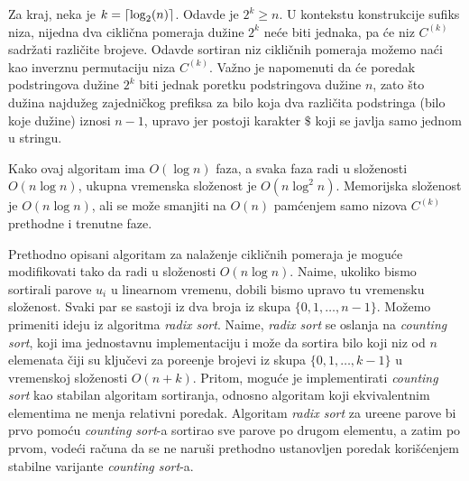 Za kraj, neka je $k = \left \lceil \log_2(n) \right \rceil$. Odavde je $2^k \geq n$. U kontekstu konstrukcije sufiks niza, nijedna dva cikli\v cna pomeraja du\v zine $2^k$ ne\' ce biti jednaka, pa \' ce niz $C^{(k)}$ sadr\v zati razli\v cite brojeve. Odavde sortiran niz cikli\v cnih pomeraja mo\v zemo na\' ci kao inverznu permutaciju niza $C^{(k)}$. Va\v zno je napomenuti da \' ce poredak podstringova du\v zine $2^k$ biti jednak poretku podstringova du\v zine $n$, zato \v sto du\v zina najdu\v zeg zajedni\v ckog prefiksa za bilo koja dva razli\v cita podstringa (bilo koje du\v zine) iznosi $n-1$, upravo jer postoji karakter $\$$ koji se javlja samo jednom u stringu.

Kako ovaj algoritam ima $O(\log n)$ faza, a svaka faza radi u slo\v zenosti $O(n \log n)$, ukupna vremenska slo\v zenost je $O(n \log^2 n)$. Memorijska slo\v zenost je $O(n \log n)$, ali se mo\v ze smanjiti na $O(n)$ pam\' cenjem samo nizova $C^{(k)}$ prethodne i trenutne faze.

\noindent
\begin{minipage}[l]{\textwidth}

\end{minipage}

Prethodno opisani algoritam za nala\v zenje cikli\v cnih pomeraja je mogu\' ce modifikovati tako da radi u slo\v zenosti $O(n \log n)$. Naime, ukoliko bismo sortirali parove $u_i$ u linearnom vremenu, dobili bismo upravo tu vremensku slo\v zenost. Svaki par se sastoji iz dva broja iz skupa $\{0, 1, \ldots, n-1\}$. Mo\v zemo primeniti ideju iz algoritma \textit{radix sort}. Naime, \textit{radix sort} se oslanja na \textit{counting sort}, koji ima jednostavnu implementaciju i mo\v ze da sortira bilo koji niz od $n$ elemenata \v ciji su klju\v cevi za pore\dj enje brojevi iz skupa $\{0, 1, \ldots, k-1\}$ u vremenskoj slo\v zenosti $O(n+k)$. Pritom, mogu\' ce je implementirati \textit{counting sort} kao stabilan algoritam sortiranja, odnosno algoritam koji ekvivalentnim elementima ne menja relativni poredak. Algoritam \textit{radix sort} za ure\dj ene parove bi prvo pomo\' cu \textit{counting sort}-a sortirao sve parove po drugom elementu, a zatim po prvom, vode\' ci ra\v cuna da se ne naru\v si prethodno ustanovljen poredak kori\v s\' cenjem stabilne varijante \textit{counting sort}-a.

